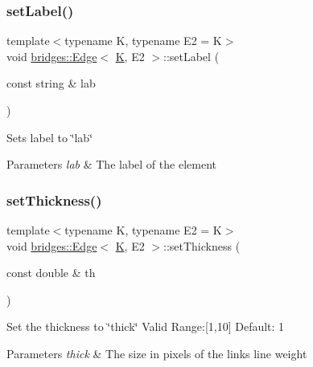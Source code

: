 \subsubsection{\texorpdfstring{setLabel()}{setLabel()}}
{\footnotesize\ttfamily template$<$typename K, typename E2 = K$>$ \\
void \mbox{\hyperlink{classbridges_1_1_edge}{bridges\+::\+Edge}}$<$ \mbox{\hyperlink{namespacebridges_acfb0a4f7877d8f63de3e6862004c50edaa5f3c6a11b03839d46af9fb43c97c188}{K}}, E2 $>$\+::set\+Label (\begin{DoxyParamCaption}\item[{const string \&}]{lab }\end{DoxyParamCaption})\hspace{0.3cm}{\ttfamily [inline]}}

Sets label to \char`\"{}lab\char`\"{}


\begin{DoxyParams}{Parameters}
{\em lab} & The label of the element \\
\hline
\end{DoxyParams}
\mbox{\label{classbridges_1_1_edge_ab03559da0e0b95de8d659217ac4bda96}} 
\subsubsection{\texorpdfstring{setThickness()}{setThickness()}}
{\footnotesize\ttfamily template$<$typename K, typename E2 = K$>$ \\
void \mbox{\hyperlink{classbridges_1_1_edge}{bridges\+::\+Edge}}$<$ \mbox{\hyperlink{namespacebridges_acfb0a4f7877d8f63de3e6862004c50edaa5f3c6a11b03839d46af9fb43c97c188}{K}}, E2 $>$\+::set\+Thickness (\begin{DoxyParamCaption}\item[{const double \&}]{th }\end{DoxyParamCaption})\hspace{0.3cm}{\ttfamily [inline]}}

Set the thickness to \char`\"{}thick\char`\"{} Valid Range\+:\mbox{[}1,10\mbox{]} Default\+: 1


\begin{DoxyParams}{Parameters}
{\em thick} & The size in pixels of the link\textquotesingle{}s line weight \\
\hline
\end{DoxyParams}

